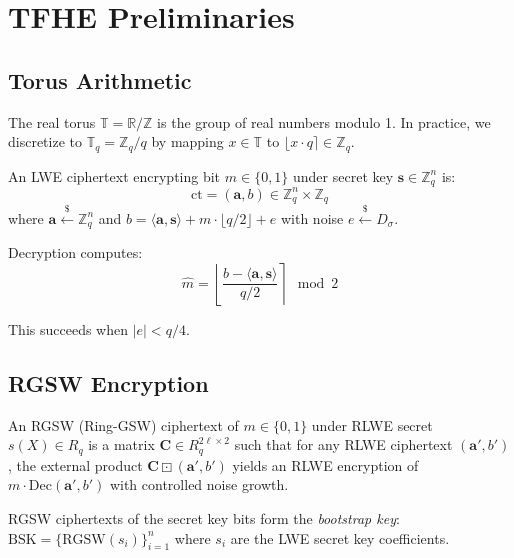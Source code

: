 \section{TFHE Preliminaries}

\label{sec:prelim}

\subsection{Torus Arithmetic}

\begin{definition}[Torus]
The real torus $\mathbb{T} = \mathbb{R}/\mathbb{Z}$ is the group of real numbers modulo 1.
In practice, we discretize to $\mathbb{T}_q = \mathbb{Z}_q / q$ by mapping $x \in \mathbb{T}$
to $\lfloor x \cdot q \rceil \in \mathbb{Z}_q$.
\end{definition}

\begin{definition}
An LWE ciphertext encrypting bit $m \in \{0, 1\}$ under secret key $\mathbf{s} \in \mathbb{Z}_q^n$ is:
\[
\text{ct} = (\mathbf{a}, b) \in \mathbb{Z}_q^n \times \mathbb{Z}_q
\]
where $\mathbf{a} \stackrel{\$}{\leftarrow} \mathbb{Z}_q^n$ and $b = \langle \mathbf{a}, \mathbf{s} \rangle + m \cdot \lfloor q/2 \rfloor + e$
with noise $e \stackrel{\$}{\leftarrow} D_\sigma$.
\end{definition}

Decryption computes:
\begin{equation}
\hat{m} = \left\lfloor \frac{b - \langle \mathbf{a}, \mathbf{s} \rangle}{q/2} \right\rceil \mod 2
\label{eq:decrypt}
\end{equation}

This succeeds when $|e| < q/4$.

\subsection{RGSW Encryption}

\begin{definition}
An RGSW (Ring-GSW) ciphertext of $m \in \{0, 1\}$ under RLWE secret $s(X) \in R_q$
is a matrix $\mathbf{C} \in R_q^{2\ell \times 2}$ such that for any RLWE ciphertext
$(\mathbf{a}', b')$, the external product $\mathbf{C} \boxdot (\mathbf{a}', b')$
yields an RLWE encryption of $m \cdot \text{Dec}(\mathbf{a}', b')$ with controlled noise growth.
\end{definition}

RGSW ciphertexts of the secret key bits form the \emph{bootstrap key}:
$\text{BSK} = \{\text{RGSW}(s_i)\}_{i=1}^n$ where $s_i$ are the LWE secret key coefficients.

